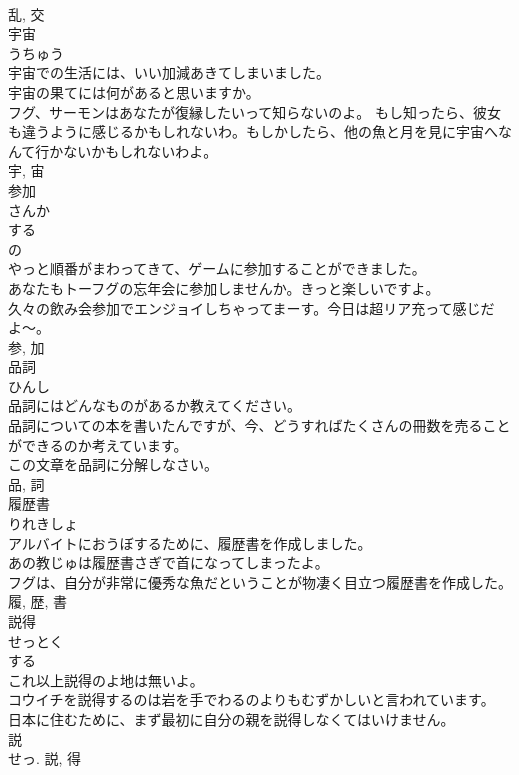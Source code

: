 \documentclass[8pt]{extreport}
\begin{document}
\begin{CJK}{UTF8}{min}
\\	乱, 交	
\\	宇宙	
\\	うちゅう	
\\	宇宙での生活には、いい加減あきてしまいました。	
\\	宇宙の果てには何があると思いますか。	
\\	フグ、サーモンはあなたが復縁したいって知らないのよ。 もし知ったら、彼女も違うように感じるかもしれないわ。もしかしたら、他の魚と月を見に宇宙へなんて行かないかもしれないわよ。	
\\	宇, 宙	
\\	参加	
\\	さんか	
\\	する 
\\	の 
\\	やっと順番がまわってきて、ゲームに参加することができました。	
\\	あなたもトーフグの忘年会に参加しませんか。きっと楽しいですよ。	
\\	久々の飲み会参加でエンジョイしちゃってまーす。今日は超リア充って感じだよ〜。	
\\	参, 加	
\\	品詞	
\\	ひんし	
\\	品詞にはどんなものがあるか教えてください。	
\\	品詞についての本を書いたんですが、今、どうすればたくさんの冊数を売ることができるのか考えています。	
\\	この文章を品詞に分解しなさい。	
\\	品, 詞	
\\	履歴書	
\\	りれきしょ	
\\	アルバイトにおうぼするために、履歴書を作成しました。	
\\	あの教じゅは履歴書さぎで首になってしまったよ。	
\\	フグは、自分が非常に優秀な魚だということが物凄く目立つ履歴書を作成した。	
\\	履, 歴, 書	
\\	説得	
\\	せっとく	
\\	する 
\\	これ以上説得のよ地は無いよ。	
\\	コウイチを説得するのは岩を手でわるのよりもむずかしいと言われています。	
\\	日本に住むために、まず最初に自分の親を説得しなくてはいけません。	
\\	説 
\\	せっ.	説, 得	

\end{CJK}
\end{document}
